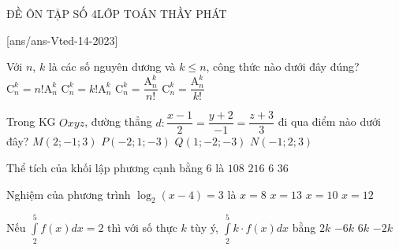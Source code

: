 \begin{name}
	{\tenchude}{ĐỀ ÔN TẬP SỐ 4}{LỚP TOÁN THẦY PHÁT}{\thoigian}
\end{name}
\setcounter{ex}{0}
\setcounter{bt}{0}
[ans/ans-Vted-14-2023]
\begin{ex}%
		Với $n$, $k$ là các số nguyên dương và $k \leq n$, công thức nào dưới đây đúng?
		\choice
		{$\mathrm{C}^k_n = n!\mathrm{A}^k_n$}
		{$\mathrm{C}^k_n = k!\mathrm{A}^k_n$}
		{$\mathrm{C}^k_n = \dfrac{\mathrm{A}^k_n}{n!}$}
		{\True $\mathrm{C}^k_n = \dfrac{\mathrm{A}^k_n}{k!}$}
\end{ex}

\begin{ex}%
	Trong KG $Oxyz$, đường thẳng $d\colon \dfrac{x-1}{2} = \dfrac{y+2}{-1} = \dfrac{z + 3}{3}$ đi qua điểm nào dưới đây?
	\choice
	{$M(2;-1;3)$}
	{$P(-2;1;-3)$}
	{\True $Q(1;-2;-3)$}
	{$N(-1;2;3)$}
\end{ex}

\begin{ex}%
	Thể tích của khối lập phương cạnh bằng $6$ là
	\choice
	{$108$}
	{\True $216$}
	{$6$}
	{$36$}
\end{ex}

\begin{ex}%
	Nghiệm của phương trình $\log_{2}(x-4) = 3$ là
	\choice
	{$x = 8$}
	{$x = 13$}
	{$x = 10$}
	{\True $x = 12$}
\end{ex}

\begin{ex}%
	Nếu $\displaystyle \int\limits_{2}^{5}f(x)dx = 2$ thì với số thực $k$ tùy ý, $\displaystyle \int\limits_{2}^{5}k\cdot f(x)dx$ bằng
	\choice
	{\True $2k$}
	{$-6k$}
	{$6k$}
	{$-2k$}
\end{ex}

